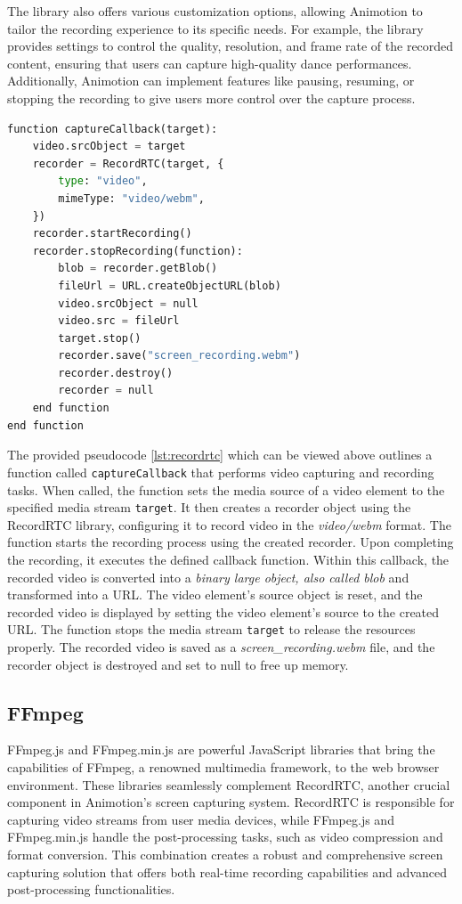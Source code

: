 The library also offers various customization options, allowing Animotion to tailor the recording experience to its specific needs. 
For example, the library provides settings to control the quality, resolution, and frame rate of the recorded content, ensuring that 
users can capture high-quality dance performances. Additionally, Animotion can implement features like pausing, resuming, or 
stopping the recording to give users more control over the capture process. \cite{rtcrecord2}

\begin{lstlisting}[language=Python,caption=Starting the screen capture process,label=lst:recordrtc]
  function captureCallback(target):
    video.srcObject = target
    recorder = RecordRTC(target, {
        type: "video",
        mimeType: "video/webm",
    })
    recorder.startRecording()
    recorder.stopRecording(function):
        blob = recorder.getBlob()
        fileUrl = URL.createObjectURL(blob)
        video.srcObject = null
        video.src = fileUrl
        target.stop()
        recorder.save("screen_recording.webm")
        recorder.destroy()
        recorder = null
    end function
end function
\end{lstlisting}

The provided pseudocode \ref{lst:recordrtc} which can be viewed above outlines a function called \texttt{captureCallback}
that performs video capturing and recording tasks. When called, the function sets the media source of a video 
element to the specified media stream \texttt{target}. It then creates a recorder object using the RecordRTC library, 
configuring it to record video in the \emph{video/webm} format.
The function starts the recording process using the created recorder. Upon completing the recording, 
it executes the defined callback function. Within this callback, the recorded video is converted into a 
\emph{binary large object, also called blob} and transformed into a URL. The video element's source object is reset, and 
the recorded video is displayed by setting the video element's source to the created URL.
The function stops the media stream \texttt{target} to release the resources properly. 
The recorded video is saved as a \emph{screen\_recording.webm} file, and the recorder object is destroyed and set to null to free up memory.

\subsection{FFmpeg}
FFmpeg.js and FFmpeg.min.js are powerful JavaScript libraries that bring the capabilities 
of FFmpeg, a renowned multimedia framework, to the web browser environment. These libraries seamlessly complement 
RecordRTC, another crucial component in Animotion's screen capturing system. RecordRTC is responsible for 
capturing video streams from user media devices, while FFmpeg.js and FFmpeg.min.js handle the post-processing tasks, 
such as video compression and format conversion. This combination creates a robust and comprehensive screen capturing 
solution that offers both real-time recording capabilities and advanced post-processing functionalities.

